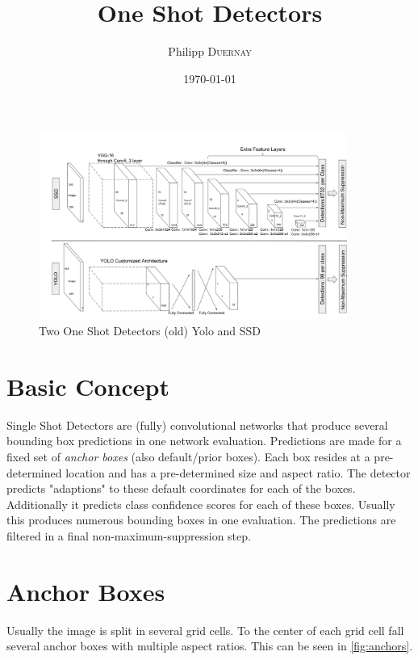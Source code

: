 \documentclass{article}
\title{One Shot Detectors} %
\author{Philipp \textsc{Duernay}} %
\date{\today} %
\begin{document}
\maketitle

\begin{figure}[h]
	\includegraphics[width=0.9\textwidth]{fig/architecture}
	\caption{Two One Shot Detectors (old) Yolo and SSD \cite{architecture}}
\end{figure}

\section{Basic Concept}
Single Shot Detectors are (fully) convolutional networks that produce several bounding box predictions in one network evaluation. Predictions are made for a fixed set of \textit{anchor boxes} (also default/prior boxes). Each box resides at a pre-determined location and has a pre-determined size and aspect ratio. The detector predicts "adaptions" to these default coordinates for each of the boxes. Additionally it predicts class confidence scores for each of these boxes. Usually this produces numerous bounding boxes in one evaluation. The predictions are filtered in a final non-maximum-suppression step.

\section{Anchor Boxes}
Usually the image is split in several grid cells. To the center of each grid cell fall several anchor boxes with multiple aspect ratios. This can be seen in \autoref{fig:anchors}.
\end{document}

